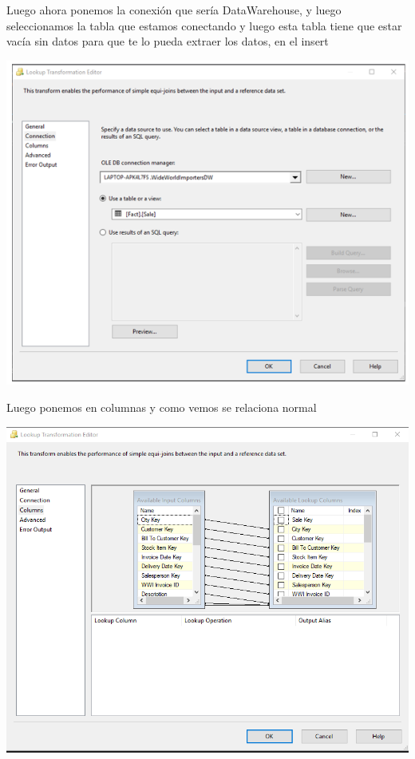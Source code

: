 \documentclass[12pt,letterpaper]{article}
\begin{document}
Luego ahora ponemos la conexi\'on que ser\'ia DataWarehouse, y luego seleccionamos la tabla que estamos conectando y luego esta tabla tiene que estar vacía sin datos para que te lo pueda extraer los datos, en el insert\\

\begin{center}
\includegraphics[width=17cm]{IMG/36-m.png} 
\end{center}

Luego ponemos en columnas y como vemos se relaciona normal\\
\begin{center}
\includegraphics[width=17cm]{IMG/38.png} 
\end{center}
\end{document}
